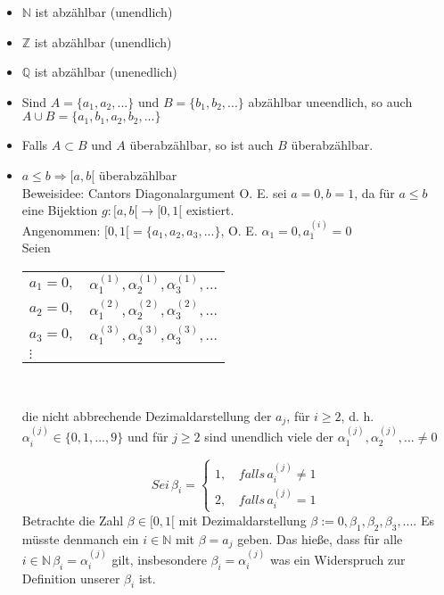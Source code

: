 \begin{itemize}[noitemsep]
	\item $\mathbb{N}$ ist abzählbar (unendlich)
	\item $\mathbb{Z}$ ist abzählbar (unendlich)
	\item $\mathbb{Q}$ ist abzählbar (unenedlich)
	\item Sind $A = \{a_1, a_2, ...\}$ und $B = \{b_1, b_2, ...\}$ abzählbar uneendlich, so auch \mbox{$A \cup B = \{a_1, b_1, a_2, b_2, ...\}$}
	\item Falls $A \subset B$ und $A$ überabzählbar, so ist auch $B$ überabzählbar.
	\item $a\le b \Rightarrow [a,b[$ überabzählbar\\
Beweisidee: Cantors Diagonalargument O. E. sei $a = 0, b = 1$, da für $a \leq b$ eine Bijektion $g:[a,b[ \rightarrow [0,1[$ existiert.\\
Angenommen: $[0,1[ = \{a_1, a_2, a_3, ...\}$, O. E. $\alpha_1 = 0, a_1^{(i)} = 0$\\

Seien

\begin{centering}
	\begin{tabulary}{\textwidth}{l l}
		$a_1=0,$ & $\alpha_1^{(1)}, \alpha_2^{(1)}, \alpha_3^{(1)}, ...$\\
		$a_2=0,$ & $\alpha_1^{(2)}, \alpha_2^{(2)}, \alpha_3^{(2)}, ...$\\
		$a_3=0,$ & $\alpha_1^{(3)}, \alpha_2^{(3)}, \alpha_3^{(3)}, ...$\\
		$\vdots$ &
	\end{tabulary}\\
\end{centering}
die nicht abbrechende Dezimaldarstellung der $a_j$, für $i\geq 2$, d. h. $\alpha_i^{(j)} \in \{0,1,...,9\}$ und für $j \geq 2$ sind unendlich viele der $\alpha_1^{(j)}, \alpha_2^{(j)},... \neq 0$

\begin{equation*}
	Sei \, \beta_i = \left\{
		\begin{aligned}
		1, \, & falls \, a_i^{(j)} \neq 1\\
		2, \, & falls \, a_i^{(j)} = 1
		\end{aligned}
		\right.
\end{equation*}
Betrachte die Zahl $\beta \in [0,1[$ mit Dezimaldarstellung $\beta := 0,\beta_1, \beta_2, \beta_3, ...$. Es müsste denmanch ein $i \in \mathbb{N}$ mit $\beta = a_j$ geben. Das hieße, dass für alle $i\in \mathbb{N} \, \beta_i = \alpha_i^{(j)}$ gilt, insbesondere $\beta_i = \alpha_i^{(j)}$ was ein Widerspruch zur Definition unserer $\beta_i$ ist. \proofend


\end{itemize}
